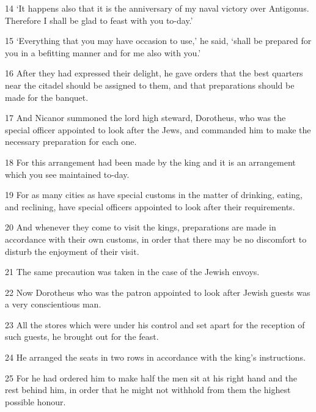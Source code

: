 \par 14 ‘It happens also that it is the anniversary of my naval victory over Antigonus. Therefore I shall be glad to feast with you to-day.’

\par 15 ‘Everything that you may have occasion to use,’ he said, ‘shall be prepared for you in a befitting manner and for me also with you.’

\par 16 After they had expressed their delight, he gave orders that the best quarters near the citadel should be assigned to them, and that preparations should be made for the banquet.

\par 17 And Nicanor summoned the lord high steward, Dorotheus, who was the special officer appointed to look after the Jews, and commanded him to make the necessary preparation for each one.

\par 18 For this arrangement had been made by the king and it is an arrangement which you see maintained to-day.

\par 19 For as many cities as have special customs in the matter of drinking, eating, and reclining, have special officers appointed to look after their requirements.

\par 20 And whenever they come to visit the kings, preparations are made in accordance with their own customs, in order that there may be no discomfort to disturb the enjoyment of their visit.

\par 21 The same precaution was taken in the case of the Jewish envoys.

\par 22 Now Dorotheus who was the patron appointed to look after Jewish guests was a very conscientious man.

\par 23 All the stores which were under his control and set apart for the reception of such guests, he brought out for the feast.

\par 24 He arranged the seats in two rows in accordance with the king's instructions.

\par 25 For he had ordered him to make half the men sit at his right hand and the rest behind him, in order that he might not withhold from them the highest possible honour.


